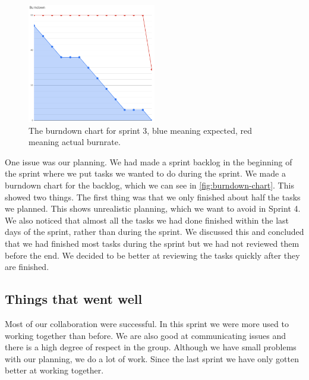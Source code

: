 \begin{figure}[ht]
    \centering
    \includegraphics[width=0.5\textwidth]{figures/burndown.png}
    \caption{The burndown chart for sprint 3, blue meaning expected, red meaning actual burnrate.}
    \label{fig:burndown-chart}
\end{figure}

One issue was our planning. We had made a sprint backlog in the beginning of the sprint where we put tasks we wanted to do during the sprint. We made a burndown chart for the backlog, which we can see in \autoref{fig:burndown-chart}. This showed two things. The first thing was that we only finished about half the tasks we planned. This shows unrealistic planning, which we want to avoid in Sprint 4. We also noticed that almost all the tasks we had done finished within the last days of the sprint, rather than during the sprint. We discussed this and concluded that we had finished most tasks during the sprint but we had not reviewed them before the end. We decided to be better at reviewing the tasks quickly after they are finished.

\subsection{Things that went well}
Most of our collaboration were successful. In this sprint we were more used to working together than before. We are also good at communicating issues and there is a high degree of respect in the group. Although we have small problems with our planning, we do a lot of work. Since the last sprint we have only gotten better at working together.
